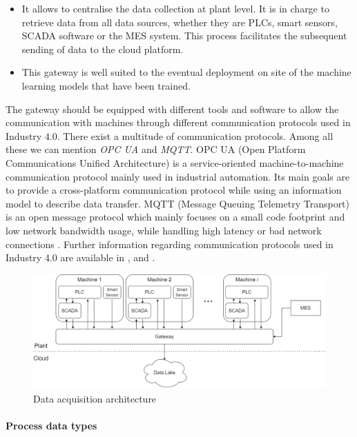 \begin{itemize}
    \item It allows to centralise the data collection at plant level. It is in charge to retrieve data from all data sources, whether they are PLCs, smart sensors, SCADA software or the MES system. This process facilitates the subsequent sending of data to the cloud platform. 
    \item This gateway is well suited  to the eventual deployment on site of the machine learning models that have been trained. 
\end{itemize}
%
The gateway should be equipped with different tools and software to allow the communication with machines through different communication protocols used in Industry 4.0. There exist a multitude of communication protocols. Among all these we can mention \textit{OPC UA} and \textit{MQTT}. OPC UA (Open Platform Communications Unified Architecture) is a service-oriented machine-to-machine communication protocol mainly used in industrial automation. Its main goals are to provide a cross-platform communication protocol while using an information model to describe data transfer. MQTT (Message Queuing Telemetry Transport) is an open message protocol which mainly focuses on a small code footprint and low network bandwidth usage, while handling high latency or bad network connections \citep{profanter2019opc}. Further information regarding communication protocols used in Industry 4.0 are available in \citet{profanter2019opc}, \citet{8262021} and \citet{zezulka2018communication}.

\begin{landscape}
\begin{figure}
\centering
\includegraphics[scale=0.5]{images/chapter_3/Data_acquisition_architecture.png}
\caption{Data acquisition architecture}
\label{fig:data_acquisition_architecture}
\end{figure}
\end{landscape}

\paragraph{Process data types}

